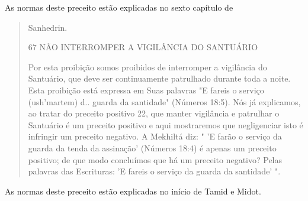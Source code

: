 As normas deste preceito estão explicadas no sexto capítulo de

\begin{quote}
Sanhedrin.

67 NÃO INTERROMPER A VIGILÂNCIA DO SANTUÁRIO

Por esta proibição somos proibidos de interromper a vigilância do
Santuário, que deve ser continuamente patrulhado durante toda a noite.
Esta proibição está expressa em Suas palavras "E fareis o serviço
(ush'martem) d.. guarda da santidade" (Números 18:5). Nós já explicamos,
ao tratar do preceito positivo 22, que manter vigilância e patrulhar o
Santuário é um preceito positi­vo e aqui mostraremos que negligenciar
isto é infringir um preceito negativo. A Mekhiltá diz: " 'E farão o
serviço da guarda da tenda da assinação' (Números 18:4) é apenas um
preceito positivo; de que modo concluímos que há um pre­ceito negativo?
Pelas palavras das Escrituras: 'E fareis o serviço da guarda da
santidade' ".
\end{quote}

As normas deste preceito estão explicadas no início de Tamid e Midot.

